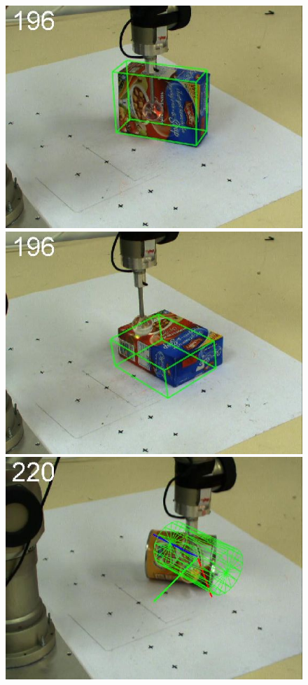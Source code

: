 \begin{figure}[htbp]
{\includegraphics[width=\imgAXwid]{./A2_2exp_87_4}
\includegraphics[width=\imgAXwid]{./A2_LWPR1_399_4}
\includegraphics[width=\imgAXwid]{./A3_2exp_39_4}
}
\end{figure}
